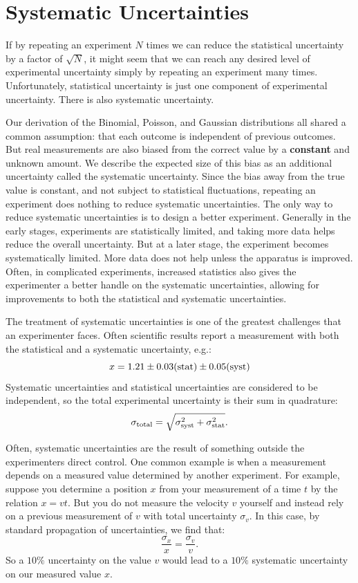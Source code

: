 \documentclass[12pt,oneside]{book}
\begin{document}
\section{Systematic Uncertainties}

If by repeating an experiment $N$ times we can reduce the statistical
uncertainty by a factor of $\sqrt{N}$, it might seem that we can reach
any desired level of experimental uncertainty simply by repeating an
experiment many times.  Unfortunately, statistical uncertainty is just
one component of experimental uncertainty.  There is also systematic
uncertainty.

Our derivation of the Binomial, Poisson, and Gaussian distributions
all shared a common assumption: that each outcome is independent of
previous outcomes.  But real measurements are also biased from the
correct value by a {\bf constant} and unknown amount.  We describe the
expected size of this bias as an additional uncertainty called the
systematic uncertainty.  Since the bias away from the true value is
constant, and not subject to statistical fluctuations, repeating an
experiment does nothing to reduce systematic uncertainties.  The only
way to reduce systematic uncertainties is to design a better
experiment.  Generally in the early stages, experiments are
statistically limited, and taking more data helps reduce the overall
uncertainty.  But at a later stage, the experiment becomes
systematically limited.  More data does not help unless the apparatus
is improved.  Often, in complicated experiments, increased statistics
also gives the experimenter a better handle on the systematic
uncertainties, allowing for improvements to both the statistical and
systematic uncertainties.

The treatment of systematic uncertainties is one of the greatest challenges that an experimenter faces.  
Often scientific results report a measurement with both the statistical and a systematic uncertainty, e.g.:
\begin{displaymath}
 x = 1.21 \pm 0.03 ({\rm stat}) \pm 0.05 ({\rm syst})
\end{displaymath}
Systematic uncertainties and statistical uncertainties are considered to be independent, so the total experimental uncertainty is their sum in quadrature:
\begin{displaymath}
\sigma_{\rm total} = \sqrt{\sigma^2_{\rm syst} + \sigma^2_{\rm stat}}.
\end{displaymath}

Often, systematic uncertainties are the result of something outside the experimenters direct control.  One common example is when a measurement depends on a measured value determined by another experiment.  For example, suppose you determine a position $x$ from your measurement of a time $t$ by the relation $x = v t$.  But you do not measure the velocity $v$ yourself and instead rely on a previous measurement of $v$ with total uncertainty $\sigma_v$.  In this case, by standard propagation of uncertainties, we find that:
\begin{displaymath}
\frac{\sigma_x}{x} = \frac{\sigma_v}{v}.
\end{displaymath}
So a $10\%$ uncertainty on the value $v$ would lead to a $10\%$ systematic uncertainty on our measured value $x$.
\end{document}
